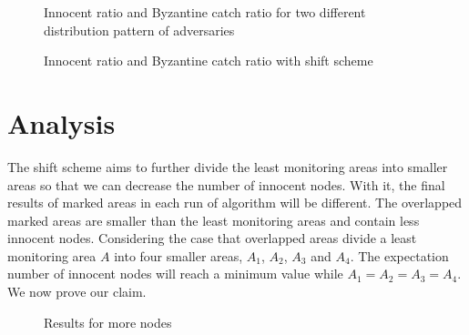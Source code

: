 \documentclass[conference]{IEEEtran}
\begin{document}
\begin{figure}[!t]
\centering
{}
\caption{Innocent ratio and Byzantine catch ratio for two different distribution pattern of adversaries}
\label{result_origin}
\end{figure}
\begin{figure}[!t]
\centering
{}
\caption{Innocent ratio and Byzantine catch ratio with shift scheme}
\label{result_shift}
\end{figure}

\section{Analysis}
The shift scheme aims to further divide the least monitoring areas into smaller areas so that we can decrease the number of innocent nodes. With it, the final results of marked areas in each run of algorithm will be different. The overlapped marked areas are smaller than the least monitoring areas and contain less innocent nodes. Considering the case that overlapped areas divide a least monitoring area $A$ into four smaller areas, $A_1$, $A_2$, $A_3$ and $A_4$. The expectation number of innocent nodes will reach a minimum value while $A_1 = A_2 = A_3 = A_4$. We now prove our claim.
\begin{figure}[!t]
\centering
{}
\caption{Results for more nodes}
\label{result_more}
\end{figure}
\end{document}
